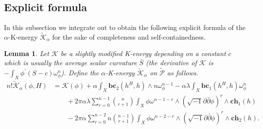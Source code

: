 \documentclass[10pt, letterpaper]{amsart}
\theoremstyle{plain}
\newtheorem{lemma}[theorem]{Lemma}
\theoremstyle{definition}
\numberwithin{equation}{section}
\begin{document}
\subsection{Explicit formula}
In this subsection we integrate out to obtain the following explicit formula of the $\alpha$-K-energy $\widetilde{\mathcal{K}}_\alpha$ for the sake of completeness and self-containedness. 

\begin{lemma}
	Let $\mathcal{K}$ be a slightly modified K-energy depending on a constant $c$ which is usually the average scalar curvature $\bar{S}$ (the derivative of $\mathcal{K}$ is $-\int_X \phi^{'} (S-c) \omega_{\phi}^n$). Define the $\alpha$-K-energy $\widetilde{\mathcal{K}}_\alpha$ on $\widetilde{\mathcal{P}}$ as follows.
	\begin{align}
	n!\widetilde{\mathcal{K}}_\alpha(\phi, H)
	&  = \mathcal{K}(\phi) +  \alpha  \int_ X \mathbf{bc}_2 \left(h^H,h\right) \wedge n\omega_{\phi}^{n-1} -\alpha\lambda \int _{X} \mathbf{bc}_1 \left(h^H,h\right) \omega_{\phi}^n  \nonumber \\
	& \qquad +  2\pi \alpha \lambda \sum_{r=0}^{n-1}  \binom{n}{r+1} \int _X  \phi\omega ^{n-1-r} \wedge\left(\sqrt{-1}\partial\bar\partial\phi\right)^r\wedge \mathbf{ch}_1\left(h\right) \nonumber \\ 
	& \qquad -  2 \pi \alpha  \sum _{r=0}^{n-2}  n\binom{n-1}{r+1} \int_X  \phi \omega ^{n-2-r}\wedge \left(\sqrt{-1}\partial\bar\partial \phi\right)^r\wedge \mathbf{ch}_2\left(h\right).
	\label{newmabuchi}
	\end{align}
	
\end{lemma}
\end{document}
